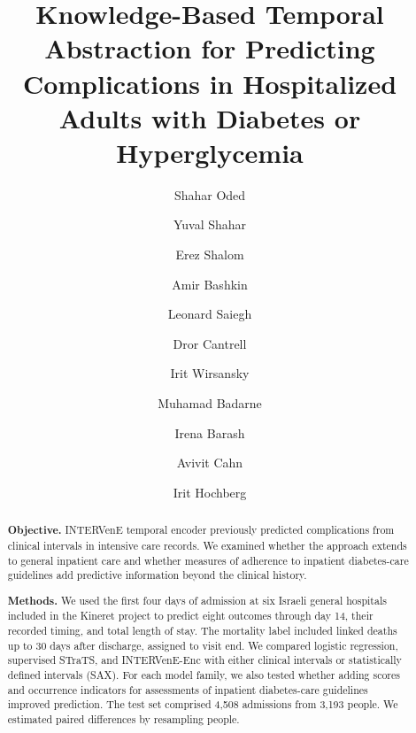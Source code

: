 \documentclass[preprint,12pt]{elsarticle}
\begin{document}
\begin{frontmatter}

\title{Knowledge-Based Temporal Abstraction for Predicting Complications in Hospitalized Adults with Diabetes or Hyperglycemia}

\author[aff1]{Shahar Oded}
\author[aff1]{Yuval Shahar}
\author[aff1]{Erez Shalom}
\author[aff2,aff3]{Amir Bashkin}
\author[aff4,aff5]{Leonard Saiegh}
\author[aff6]{Dror Cantrell}
\author[aff7]{Irit Wirsansky}
\author[aff2,aff8]{Muhamad Badarne}
\author[aff9]{Irena Barash}
\author[aff10,aff11]{Avivit Cahn}
\author[aff4,aff7]{Irit Hochberg}

\address[aff1]{Medical Informatics Research Center,
Ben-Gurion University of the Negev, Beer Sheva, Israel}
\address[aff2]{Azrieli Faculty of Medicine,
Bar-Ilan University, Safed, Israel}
\address[aff3]{Endocrinology and Diabetes Unit,
Galilee Medical Center, Nahariya, Israel}
\address[aff4]{Bruce Rappaport Faculty of Medicine,
Technion---Israel Institute of Technology, Haifa, Israel}
\address[aff5]{Endocrinology Institute,
Bnai Zion Medical Center, Haifa, Israel}
\address[aff6]{Internal Medicine Department C,
Shamir Medical Center, Beer Yaakov, Israel}
\address[aff7]{Endocrinology Unit,
Hillel Yaffe Medical Center, Hadera, Israel}
\address[aff8]{Endocrinology and Diabetes Service,
Tzafon Medical Center, Ramat Poriya, Israel}
\address[aff9]{Internal Medicine Department C,
Barzilai Medical Center, Ashkelon, Israel}
\address[aff10]{Internal Medicine Department A,
Hadassah Ein Kerem, Jerusalem, Israel}
\address[aff11]{Faculty of Medicine,
Hadassah Hebrew University Hospital, Jerusalem, Israel}

\begin{abstract}
\textbf{Objective.} INTERVenE temporal encoder previously predicted complications from clinical intervals in intensive care records. We examined whether the approach extends to general inpatient care and whether measures of adherence to inpatient diabetes-care guidelines add predictive information beyond the clinical history.

\textbf{Methods.} We used the first four days of admission at six Israeli general hospitals included in the Kineret project to predict eight outcomes through day 14, their recorded timing, and total length of stay. The mortality label included linked deaths up to 30 days after discharge, assigned to visit end. We compared logistic regression, supervised STraTS, and INTERVenE-Enc with either clinical intervals or statistically defined intervals (SAX). For each model family, we also tested whether adding scores and occurrence indicators for assessments of inpatient diabetes-care guidelines improved prediction. The test set comprised 4,508 admissions from 3,193 people. We estimated paired differences by resampling people.


\end{abstract}
\end{frontmatter}
\end{document}
